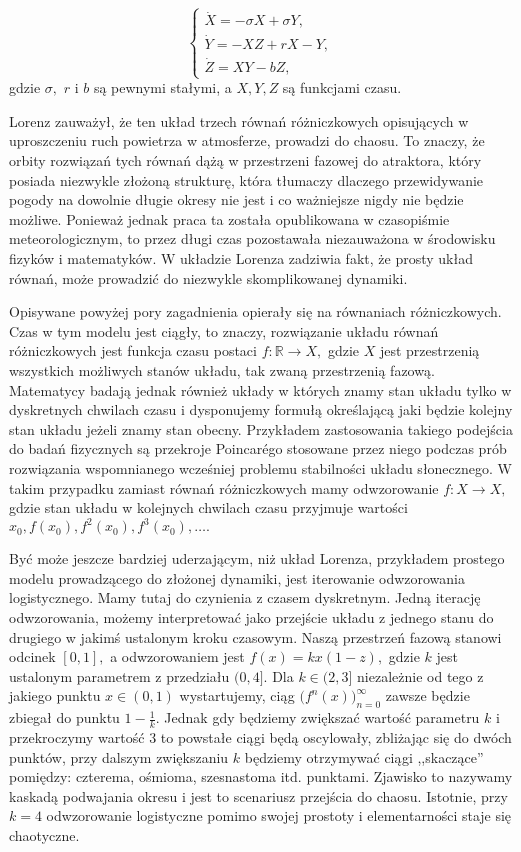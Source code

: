 \documentclass[licencjacka]{pwr_wmat_praca_dyplomowa}
\theoremstyle{plain}
\numberwithin{theorem}{chapter}
\theoremstyle{definition}
\numberwithin{theorem}{chapter}
\begin{document}
\begin{equation}
\begin{cases}
\dot{X} = -\sigma X + \sigma Y, \\
\dot{Y} = -XZ + rX - Y, \\
\dot{Z} = XY - bZ,
\end{cases}
\end{equation}
gdzie $\sigma,$ $r$ i $b$ są pewnymi stałymi, a $X, Y, Z$ są funkcjami czasu.

Lorenz zauważył, że ten układ trzech równań różniczkowych opisujących w uproszczeniu ruch powietrza w atmosferze, prowadzi do chaosu. To znaczy, że orbity rozwiązań tych równań dążą w przestrzeni fazowej do atraktora, który posiada niezwykle złożoną strukturę, która tłumaczy dlaczego przewidywanie pogody na dowolnie długie okresy nie jest i co ważniejsze nigdy nie będzie możliwe.
Ponieważ jednak praca ta została opublikowana w czasopiśmie meteorologicznym, to przez długi czas pozostawała niezauważona w środowisku fizyków i matematyków.
W układzie Lorenza zadziwia fakt, że prosty układ równań, może prowadzić do niezwykle skomplikowanej dynamiki. 

Opisywane powyżej pory zagadnienia opierały się na równaniach różniczkowych. Czas w tym modelu jest ciągły, to znaczy, rozwiązanie układu równań różniczkowych jest funkcja czasu postaci $f: \mathbb{R} \rightarrow X,$ gdzie $X$ jest przestrzenią wszystkich możliwych stanów układu, tak zwaną przestrzenią fazową. Matematycy badają jednak również układy w których znamy stan układu tylko w dyskretnych chwilach czasu i dysponujemy formułą określającą jaki będzie kolejny stan układu jeżeli znamy stan obecny. Przykładem zastosowania takiego podejścia do badań fizycznych są przekroje Poincar\'ego stosowane przez niego podczas prób rozwiązania wspomnianego wcześniej problemu stabilności układu słonecznego. W takim przypadku zamiast równań różniczkowych mamy odwzorowanie $f: X \rightarrow X,$ gdzie stan układu w kolejnych chwilach czasu przyjmuje wartości $x_0, f(x_0), f^2(x_0), f^3(x_0), \ldots.$

Być może jeszcze bardziej uderzającym, niż układ Lorenza, przykładem prostego modelu prowadzącego do złożonej dynamiki, jest iterowanie odwzorowania logistycznego.
Mamy tutaj do czynienia z czasem dyskretnym. Jedną iterację odwzorowania, możemy interpretować jako przejście układu z jednego stanu do drugiego w jakimś ustalonym kroku czasowym. Naszą przestrzeń fazową stanowi odcinek $[0,1],$ a odwzorowaniem jest $f(x) = kx(1-z),$ gdzie $k$ jest ustalonym parametrem z przedziału $(0,4].$
Dla $k \in (2, 3]$ niezależnie od tego z jakiego punktu $x \in (0,1)$ wystartujemy, ciąg $\big(f^{n}(x)\big)_{n=0}^{\infty}$ zawsze będzie zbiegał do punktu $1- \frac{1}{k}.$ Jednak gdy będziemy zwiększać wartość parametru $k$ i przekroczymy wartość $3$ to powstałe ciągi będą oscylowały, zbliżając się do dwóch punktów, przy dalszym zwiększaniu $k$ będziemy otrzymywać ciągi ,,skaczące'' pomiędzy: czterema, ośmioma, szesnastoma itd. punktami. Zjawisko to nazywamy kaskadą podwajania okresu i jest to scenariusz przejścia do chaosu. Istotnie, przy $k=4$ odwzorowanie logistyczne pomimo swojej prostoty i elementarności staje się chaotyczne.
\end{document}
